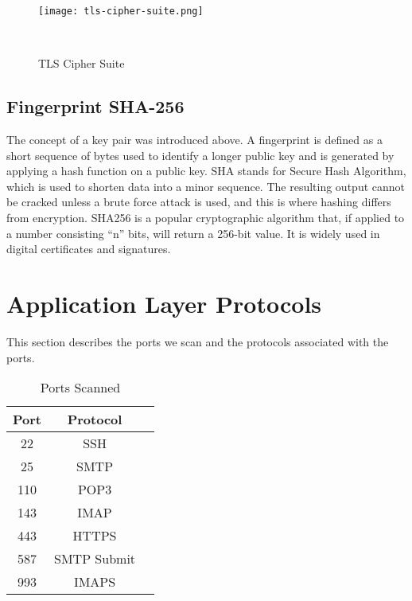 \begin{figure}[h!]
    \centering
    \texttt{[image: tls-cipher-suite.png]}
    \caption{TLS Cipher Suite}~\cite{CipherSu69:online}
    \label{fig: CipherSuites}
\end{figure}

\subsection{Fingerprint SHA-256}
The concept of a key pair was introduced above. A fingerprint is defined as a short sequence of bytes used to identify a longer public key and is generated
by applying a hash function on a public key. SHA stands for Secure Hash Algorithm, which is used to shorten data into a minor sequence. The resulting 
output cannot be cracked unless a brute force attack is used, and this is where hashing differs from encryption. SHA256 is a popular cryptographic
algorithm that, if applied to a number consisting ``n'' bits, will return a 256-bit value. It is widely used in digital certificates and signatures. 

\section{Application Layer Protocols}
This section describes the ports we scan and the protocols associated with the ports. 
\begin{table}[h!]
    \centering
    \begin{tabular}{|c|c|c|}
        \hline
        Port &  Protocol\\
        \hline
        22  &   SSH\\ 
        \hline
        25  &   SMTP\\
        \hline
        110 &   POP3\\  
        \hline
        143 &   IMAP\\  
        \hline
        443 &   HTTPS\\ 
        \hline
        587 &   SMTP Submit\\  
        \hline
        993 &   IMAPS\\ 
        \hline
    \end{tabular}
    \caption{Ports Scanned}
    \label{table:alports}
\end{table}

